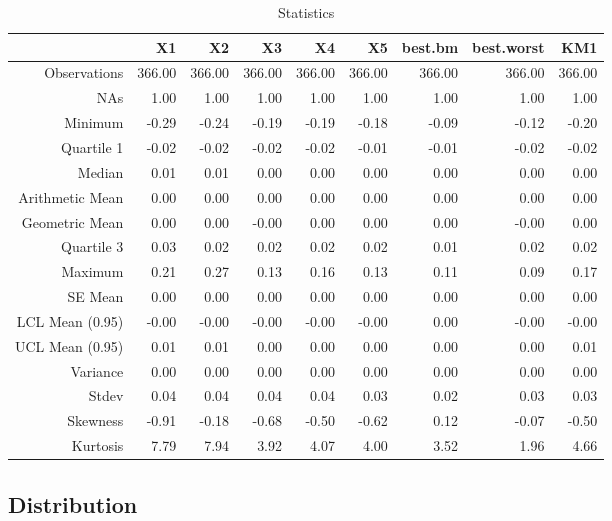 \documentclass{article}
\begin{document}
\begin{table}[ht]
\begin{center}
\caption{Statistics}
\begin{tabular}{rrrrrrrrr}
  \hline
 & X1 & X2 & X3 & X4 & X5 & best.bm & best.worst & KM1 \\ 
  \hline
Observations & 366.00 & 366.00 & 366.00 & 366.00 & 366.00 & 366.00 & 366.00 & 366.00 \\ 
  NAs & 1.00 & 1.00 & 1.00 & 1.00 & 1.00 & 1.00 & 1.00 & 1.00 \\ 
  Minimum & -0.29 & -0.24 & -0.19 & -0.19 & -0.18 & -0.09 & -0.12 & -0.20 \\ 
  Quartile 1 & -0.02 & -0.02 & -0.02 & -0.02 & -0.01 & -0.01 & -0.02 & -0.02 \\ 
  Median & 0.01 & 0.01 & 0.00 & 0.00 & 0.00 & 0.00 & 0.00 & 0.00 \\ 
  Arithmetic Mean & 0.00 & 0.00 & 0.00 & 0.00 & 0.00 & 0.00 & 0.00 & 0.00 \\ 
  Geometric Mean & 0.00 & 0.00 & -0.00 & 0.00 & 0.00 & 0.00 & -0.00 & 0.00 \\ 
  Quartile 3 & 0.03 & 0.02 & 0.02 & 0.02 & 0.02 & 0.01 & 0.02 & 0.02 \\ 
  Maximum & 0.21 & 0.27 & 0.13 & 0.16 & 0.13 & 0.11 & 0.09 & 0.17 \\ 
  SE Mean & 0.00 & 0.00 & 0.00 & 0.00 & 0.00 & 0.00 & 0.00 & 0.00 \\ 
  LCL Mean (0.95) & -0.00 & -0.00 & -0.00 & -0.00 & -0.00 & 0.00 & -0.00 & -0.00 \\ 
  UCL Mean (0.95) & 0.01 & 0.01 & 0.00 & 0.00 & 0.00 & 0.00 & 0.00 & 0.01 \\ 
  Variance & 0.00 & 0.00 & 0.00 & 0.00 & 0.00 & 0.00 & 0.00 & 0.00 \\ 
  Stdev & 0.04 & 0.04 & 0.04 & 0.04 & 0.03 & 0.02 & 0.03 & 0.03 \\ 
  Skewness & -0.91 & -0.18 & -0.68 & -0.50 & -0.62 & 0.12 & -0.07 & -0.50 \\ 
  Kurtosis & 7.79 & 7.94 & 3.92 & 4.07 & 4.00 & 3.52 & 1.96 & 4.66 \\ 
   \hline
\end{tabular}
\end{center}
\end{table}
\subsection{Distribution}
\end{document}
